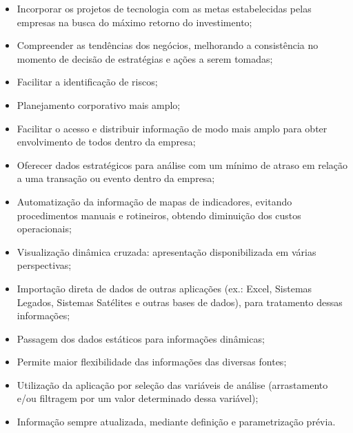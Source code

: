 \begin{itemize}

    \item Incorporar os projetos de tecnologia com as metas estabelecidas pelas empresas na busca do m\'{a}ximo retorno do investimento;
    
    \item Compreender as tendências dos neg\'{o}cios, melhorando a consistência no momento de decis\~{a}o de estrat\'{e}gias e a\c{c}\~{o}es a serem tomadas;
    
    \item Facilitar a identifica\c{c}\~{a}o de riscos;
    
    \item Planejamento corporativo mais amplo;
    
    \item Facilitar o acesso e distribuir informa\c{c}\~{a}o de modo mais amplo para obter envolvimento de todos dentro da empresa;
    
    \item Oferecer dados estrat\'{e}gicos para an\'{a}lise com um m\'{i}nimo de atraso em rela\c{c}\~{a}o a uma transa\c{c}\~{a}o ou evento dentro da empresa;
    
    \item Automatiza\c{c}\~{a}o da informa\c{c}\~{a}o de mapas de indicadores, evitando procedimentos manuais e rotineiros, obtendo diminui\c{c}\~{a}o dos custos operacionais;
    
    \item Visualiza\c{c}\~{a}o dinâmica cruzada: apresenta\c{c}\~{a}o disponibilizada em v\'{a}rias perspectivas;
    
    \item Importa\c{c}\~{a}o direta de dados de outras aplica\c{c}\~{o}es (ex.: Excel, Sistemas Legados, Sistemas Sat\'{e}lites e outras bases de dados), para tratamento dessas informa\c{c}\~{o}es;
    
    \item Passagem dos dados est\'{a}ticos para informa\c{c}\~{o}es dinâmicas;
    
    \item Permite maior flexibilidade das informa\c{c}\~{o}es das diversas fontes;
    
    \item Utiliza\c{c}\~{a}o da aplica\c{c}\~{a}o por sele\c{c}\~{a}o das vari\'{a}veis de an\'{a}lise (arrastamento e/ou filtragem por um valor determinado dessa vari\'{a}vel);
    
    \item Informa\c{c}\~{a}o sempre atualizada, mediante defini\c{c}\~{a}o e parametriza\c{c}\~{a}o pr\'{e}via.
 
 \end{itemize}
 
